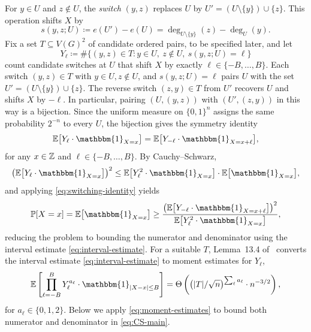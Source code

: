 For $y \in U$ and $z \notin U$, the \emph{switch} $(y, z)$ replaces $U$ by $U' = (U \setminus \{y\}) \cup \{z\}$. This operation shifts $X$ by
\[
  s(y, z; U) \coloneqq e(U') - e(U) = \deg_{U \setminus \{y\}}(z) - \deg_{U}(y).
\]
Fix a set $T \subseteq V(G)^2$ of candidate ordered pairs, to be specified later, and let
\[
  Y_\ell \coloneqq \#\bigl\{(y, z) \in T : y \in U,\ z \notin U,\ s(y, z; U) = \ell\bigr\}
\]
count candidate switches at $U$ that shift $X$ by exactly $\ell \in \{-B, \ldots, B\}$. Each switch $(y, z) \in T$ with $y \in U, z \notin U$, and $s(y, z; U) = \ell$ pairs $U$ with the set $U' = (U \setminus \{y\}) \cup \{z\}$. The reverse switch $(z, y) \in T$ from $U'$ recovers $U$ and shifts $X$ by $-\ell$. In particular, pairing $(U, (y, z))$ with $(U', (z, y))$ in this way is a bijection. Since the uniform measure on $\{0,1\}^n$ assigns the same probability $2^{-n}$ to every $U$, the bijection gives the symmetry identity
\begin{equation}
  \label{eq:switching-identity}
  \E\bigl[Y_\ell \cdot \mathbbm{1}_{X = x}\bigr] = \E\bigl[Y_{-\ell} \cdot \mathbbm{1}_{X = x + \ell}\bigr],
\end{equation}
for any $x \in \mathbb{Z}$ and $\ell \in \{-B, \ldots, B\}$. By Cauchy--Schwarz,
\[
  \bigl(\E\bigl[Y_{\ell} \cdot \mathbbm{1}_{X = x}\bigr]\bigr)^2 \leq \E\bigl[Y_\ell^2 \cdot \mathbbm{1}_{X = x}\bigr] \cdot \E\bigl[\mathbbm{1}_{X = x}\bigr],
\]
and applying \eqref{eq:switching-identity} yields
\begin{equation}
  \label{eq:CS-main}
  \prob[X = x] = \E\bigl[\mathbbm{1}_{X = x}\bigr] \geq \frac{\bigl(\E\bigl[Y_{-\ell} \cdot \mathbbm{1}_{X = x + \ell}\bigr]\bigr)^2}{\E\bigl[Y_\ell^2 \cdot \mathbbm{1}_{X = x}\bigr]},
\end{equation}
reducing the problem to bounding the numerator and denominator using the interval estimate \eqref{eq:interval-estimate}. For a suitable $T$, Lemma~13.4 of~\cite{Kwan_2023} converts the interval estimate \eqref{eq:interval-estimate} to moment estimates for $Y_\ell$,
\begin{equation}
  \label{eq:moment-estimates}
  \E\left[\prod_{\ell=-B}^B Y_\ell^{a_\ell} \cdot \mathbbm{1}_{|X - x| \leq B}\right] = \Theta\left(\bigl(|T|/\sqrt n\bigr)^{\sum_\ell a_\ell} \cdot n^{-3/2}\right),
\end{equation}
for $a_\ell \in \{0,1,2\}$. Below we apply \eqref{eq:moment-estimates} to bound both numerator and denominator in \eqref{eq:CS-main}.

